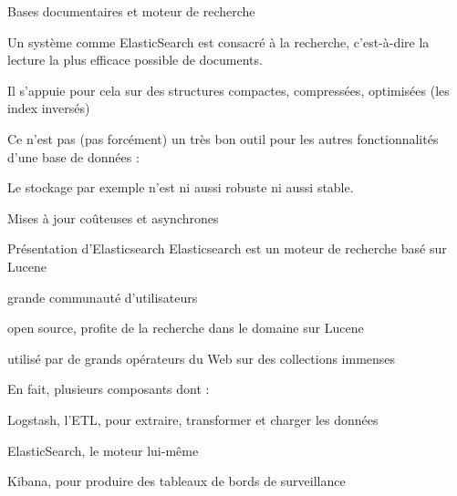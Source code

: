 \begin{frame}{Bases documentaires et moteur de recherche}

Un système comme ElasticSearch est consacré à la \alert{recherche},
    c'est-à-dire la lecture la plus efficace possible de documents.

\vfill

Il s'appuie pour cela sur des structures compactes, compressées,
    optimisées (les \alert{index inversés}) 

\vfill

Ce n'est pas (pas forcément) un très bon outil pour les autres fonctionnalités
    d'une base de données :
    \begin{redbullet}
      \item Le stockage par exemple n'est ni aussi robuste ni aussi stable.
      \item Mises à jour coûteuses et asynchrones
    \end{redbullet}

\end{frame} %

\begin{frame}{Présentation d'Elasticsearch}
  Elasticsearch est un moteur de recherche basé sur Lucene
  \begin{redbullet}
    \item grande communauté d'utilisateurs
    \item open source, profite de la recherche dans le domaine sur Lucene
    \item utilisé par de grands opérateurs du Web sur des collections immenses
  \end{redbullet}
  \medskip
  En fait, plusieurs composants dont :
  \begin{redbullet}
    \item Logstash, l'ETL, pour extraire, transformer et charger les données
    \item ElasticSearch, le moteur lui-même
    \item Kibana, pour produire des tableaux de bords de surveillance
  \end{redbullet}
\end{frame}


